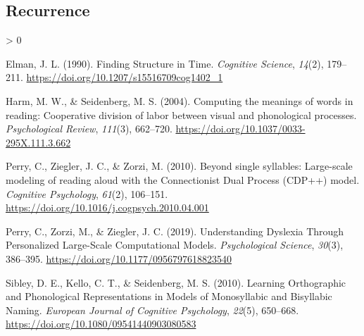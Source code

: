 \documentclass[
  american,
  man,floatsintext]{apa6}
\newlength{\cslhangindent}
\newenvironment{CSLReferences}[2] %
 {%
  \setlength{\parindent}{0pt}
  \ifodd #1 \everypar{\setlength{\hangindent}{\cslhangindent}}\ignorespaces\fi
  \ifnum #2 > 0
  \setlength{\parskip}{#2\baselineskip}
  \fi
 }%
 {}
\begin{document}
\hypertarget{recurrence}{%
\subsection*{Recurrence}\label{recurrence}}

\hypertarget{refs}{}
\begin{CSLReferences}{1}{0}
\leavevmode\hypertarget{ref-Elman1990}{}%
Elman, J. L. (1990). {Finding Structure in Time}. \emph{Cognitive Science}, \emph{14}(2), 179--211. \url{https://doi.org/10.1207/s15516709cog1402_1}

\leavevmode\hypertarget{ref-Harm2004}{}%
Harm, M. W., \& Seidenberg, M. S. (2004). {Computing the meanings of words in reading: Cooperative division of labor between visual and phonological processes}. \emph{Psychological Review}, \emph{111}(3), 662--720. \url{https://doi.org/10.1037/0033-295X.111.3.662}

\leavevmode\hypertarget{ref-Perry2010}{}%
Perry, C., Ziegler, J. C., \& Zorzi, M. (2010). {Beyond single syllables: Large-scale modeling of reading aloud with the Connectionist Dual Process (CDP++) model}. \emph{Cognitive Psychology}, \emph{61}(2), 106--151. \url{https://doi.org/10.1016/j.cogpsych.2010.04.001}

\leavevmode\hypertarget{ref-Perry2019}{}%
Perry, C., Zorzi, M., \& Ziegler, J. C. (2019). {Understanding Dyslexia Through Personalized Large-Scale Computational Models}. \emph{Psychological Science}, \emph{30}(3), 386--395. \url{https://doi.org/10.1177/0956797618823540}

\leavevmode\hypertarget{ref-Sibley2010}{}%
Sibley, D. E., Kello, C. T., \& Seidenberg, M. S. (2010). {Learning Orthographic and Phonological Representations in Models of Monosyllabic and Bisyllabic Naming}. \emph{European Journal of Cognitive Psychology}, \emph{22}(5), 650--668. \url{https://doi.org/10.1080/09541440903080583}

\end{CSLReferences}


\clearpage
\renewcommand{\listtablename}{Table captions}
\end{document}
